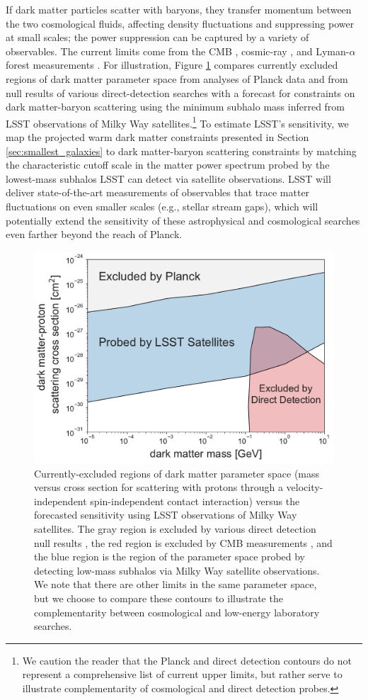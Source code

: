 If dark matter particles scatter with baryons, they transfer momentum between the two cosmological fluids, affecting density fluctuations and suppressing power at small scales; the power suppression can be captured by a variety of observables. The current limits come from the CMB \citep{Gluscevic:2017ywp}, cosmic-ray \citep{Cappiello:2018hsu}, and Lyman-$\alpha$ forest measurements \citep{Xu:2018efh}. For illustration, Figure \ref{fig:dd} compares currently excluded regions of dark matter parameter space from analyses of Planck data and from null results of various direct-detection searches with a forecast for constraints on dark matter-baryon scattering using the minimum subhalo mass inferred from LSST observations of Milky Way satellites.\footnote{We caution the reader that the Planck and direct detection contours do not represent a comprehensive list of current upper limits, but rather serve to illustrate complementarity of cosmological and direct detection probes.} To estimate LSST's sensitivity, we map the projected warm dark matter constraints presented in Section \ref{sec:smallest_galaxies} to dark matter-baryon scattering constraints by matching the characteristic cutoff scale in the matter power spectrum probed by the lowest-mass subhalos LSST can detect via satellite observations. LSST will deliver state-of-the-art measurements of observables that trace matter fluctuations on even smaller scales (e.g., stellar stream gaps), which will potentially extend the sensitivity of these astrophysical and cosmological searches even farther beyond the reach of Planck.

\begin{figure}
\centering
\includegraphics[width=0.6\columnwidth]{figures/planck_dd.pdf}
\caption{Currently-excluded regions of dark matter parameter space (mass versus cross section for scattering with protons through a velocity-independent spin-independent contact interaction) versus the forecasted sensitivity using LSST observations of Milky Way satellites. The gray region is excluded by various direct detection null results \citep{2018PhRvD..97l3013K}, the red region is excluded by CMB measurements \citep{Gluscevic:2017ywp}, and the blue region is the region of the parameter space probed by detecting low-mass subhalos via Milky Way satellite observations. We note that there are other limits in the same parameter space, but we choose to compare these contours to illustrate the complementarity between cosmological and low-energy laboratory searches.}
\label{fig:dd}
\end{figure}

